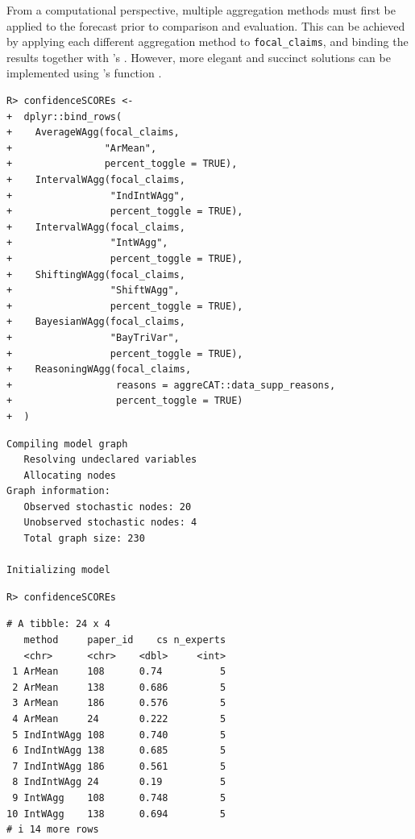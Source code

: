\documentclass[article]{jss}
\newcommand{\fct}[1]{\code{#1()}}
\begin{document}
From a computational perspective, multiple aggregation methods must
first be applied to the forecast prior to comparison and evaluation.
This can be achieved by applying each different aggregation method to
\texttt{focal\_claims}, and binding the results together with
's \fct{row_bind}. However, more elegant and succinct
solutions can be implemented using 's \fct{map_dfr} function
\citep[see \citet{lst-multi-method-workflow-non-supp} and
\citet{lst-multi-method-workflow-both}]{purrr2020}.

\begin{verbatim}
R> confidenceSCOREs <-
+  dplyr::bind_rows(
+    AverageWAgg(focal_claims,
+                "ArMean",
+                percent_toggle = TRUE),
+    IntervalWAgg(focal_claims,
+                 "IndIntWAgg",
+                 percent_toggle = TRUE),
+    IntervalWAgg(focal_claims,
+                 "IntWAgg",
+                 percent_toggle = TRUE),
+    ShiftingWAgg(focal_claims,
+                 "ShiftWAgg",
+                 percent_toggle = TRUE),
+    BayesianWAgg(focal_claims,
+                 "BayTriVar",
+                 percent_toggle = TRUE),
+    ReasoningWAgg(focal_claims,
+                  reasons = aggreCAT::data_supp_reasons,
+                  percent_toggle = TRUE)
+  )
\end{verbatim}

\begin{verbatim}
Compiling model graph
   Resolving undeclared variables
   Allocating nodes
Graph information:
   Observed stochastic nodes: 20
   Unobserved stochastic nodes: 4
   Total graph size: 230

Initializing model
\end{verbatim}

\begin{verbatim}
R> confidenceSCOREs
\end{verbatim}

\begin{verbatim}
# A tibble: 24 x 4
   method     paper_id    cs n_experts
   <chr>      <chr>    <dbl>     <int>
 1 ArMean     108      0.74          5
 2 ArMean     138      0.686         5
 3 ArMean     186      0.576         5
 4 ArMean     24       0.222         5
 5 IndIntWAgg 108      0.740         5
 6 IndIntWAgg 138      0.685         5
 7 IndIntWAgg 186      0.561         5
 8 IndIntWAgg 24       0.19          5
 9 IntWAgg    108      0.748         5
10 IntWAgg    138      0.694         5
# i 14 more rows
\end{verbatim}
\end{document}
